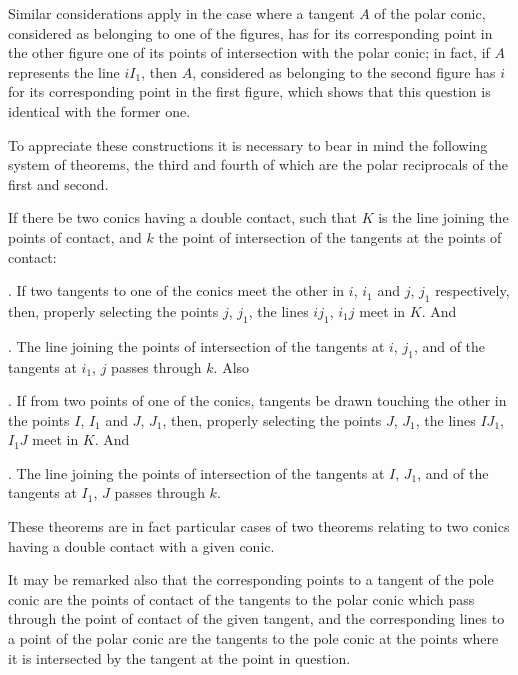 \documentclass[11pt]{article}
\begin{document}
\medskip

Similar considerations apply in the case where a tangent $A$ of the polar conic,
considered as belonging to one of the figures, has for its corresponding point in the
other figure one of its points of intersection with the polar conic; in fact, if $A$
represents the line $iI_{1}$, then $A$, considered as belonging to the second figure has $i$ for
its corresponding point in the first figure, which shows that this question is identical
with the former one.

\medskip

To appreciate these constructions it is necessary to bear in mind the following
system of theorems, the third and fourth of which are the polar reciprocals of the
first and second.

\medskip

If there be two conics having a double contact, such that $K$ is the line joining
the points of contact, and $k$ the point of intersection of the tangents at the points of
contact:

. If two tangents to one of the conics meet the other in $i$, $i_{1}$ and $j$, $j_{1}$ respectively,
then, properly selecting the points $j$, $j_{1}$, the lines $ij_{1}$, $i_{1}j$ meet in $K$. And

. The line joining the points of intersection of the tangents at $i$, $j_{1}$, and of
the tangents at $i_{1}$, $j$ passes through $k$. Also

. If from two points of one of the conics, tangents be drawn touching the other
in the points $I$, $I_{1}$ and $J$, $J_{1}$, then, properly selecting the points $J$, $J_{1}$, the lines
$IJ_{1}$, $I_{1}J$ meet in $K$. And

. The line joining the points of intersection of the tangents at $I$, $J_{1}$, and of the
tangents at $I_{1}$, $J$ passes through $k$.


\medskip

These theorems are in fact particular cases of two theorems relating to two conics
having a double contact with a given conic.

\medskip

It may be remarked also that the corresponding points to a tangent of the pole
conic are the points of contact of the tangents to the polar conic which pass through
the point of contact of the given tangent, and the corresponding lines to a point of
the polar conic are the tangents to the pole conic at the points where it is intersected
by the tangent at the point in question.
\end{document}
